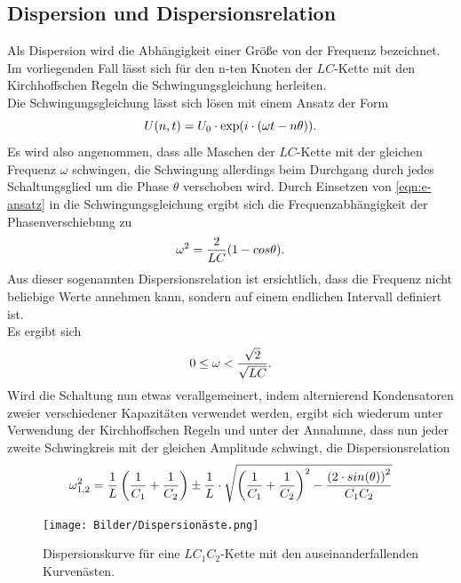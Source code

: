 \subsection{Dispersion und Dispersionsrelation}
\label{subsec-dispersion}
Als Dispersion wird die Abhängigkeit einer Größe von der Frequenz bezeichnet.
Im vorliegenden Fall lässt sich für den n-ten Knoten der $LC$-Kette mit den Kirchhoffschen Regeln die Schwingungsgleichung herleiten.\\
Die Schwingungsgleichung lässt sich lösen mit einem Ansatz der Form
\begin{equation}
	\centering
	U(n,t)=U_{\mathrm{0}} \cdot \mathrm{exp}(i\cdot( \omega t- n\theta )).
	\label{eqn:e-ansatz}
\end{equation}
Es wird also angenommen, dass alle Maschen der $LC$-Kette mit der gleichen Frequenz $\omega$ schwingen, die Schwingung allerdings beim Durchgang durch jedes Schaltungsglied um die Phase $\theta$ verschoben wird.
Durch Einsetzen von \eqref{eqn:e-ansatz} in die Schwingungsgleichung ergibt sich die Frequenzabhängigkeit der Phasenverschiebung zu
\begin{equation}
	\centering
	\omega^2=\frac{2}{LC}(1-cos{\theta}).
	\label{eqn:dispersion}
\end{equation}
Aus dieser sogenannten Dispersionsrelation ist ersichtlich, dass die Frequenz \omega nicht beliebige Werte annehmen kann,
sondern auf einem endlichen Intervall definiert ist.\\
Es ergibt sich
\begin{equation*}
	\centering
	0\leq \omega<\frac{\sqrt{2}}{\sqrt{LC}}.
\end{equation*}
Wird die Schaltung nun etwas verallgemeinert, indem alternierend Kondensatoren zweier verschiedener Kapazitäten verwendet werden,
ergibt sich wiederum unter Verwendung der Kirchhoffschen Regeln und unter der Annahmne, dass nun jeder zweite Schwingkreis mit der gleichen Amplitude
schwingt, die Dispersionsrelation
\begin{equation}
	\centering
	\omega_{1,2}^2=\frac{1}{L}\left ( \frac{1}{C_{\mathrm{1}}}+\frac{1}{C_{\mathrm{2}}} \right ) \pm \frac{1}{L} \cdot \sqrt{\left ( \frac{1}{C_{\mathrm{1}}}+\frac{1}{C_{\mathrm{2}}} \right )^2-\frac{\left(2\cdot sin(\theta)\right)^2}{C_{\mathrm{1}}C_{\mathrm{2}}}}
	\label{eqn:dispersion2}
\end{equation}
\begin{figure}
	\centering
	\texttt{[image: Bilder/Dispersionäste.png]}
	\caption{Dispersionskurve für eine $LC_{\mathrm{1}}C_{\mathrm{2}}$-Kette mit den auseinanderfallenden Kurvenästen. \cite{Anleitung}}
	\label{fig:dispersionskurve}
\end{figure}
